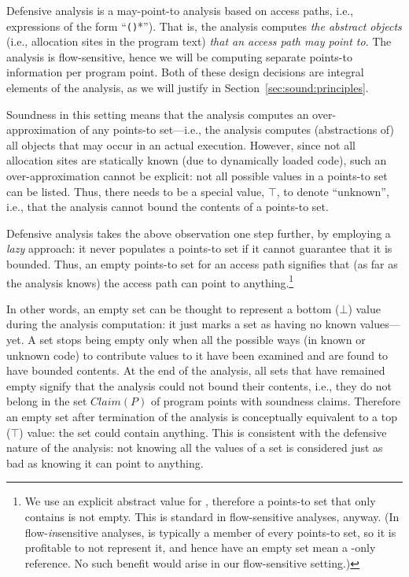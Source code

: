 Defensive analysis is a may-point-to analysis based on access paths, i.e., expressions of the form ``\texttt{()}*''). That is, the analysis computes \emph{the abstract objects} (i.e., allocation sites in the program text) \emph{that an access path may point to}. The analysis is flow-sensitive, hence we will be computing separate points-to information per program point. Both of these design decisions are integral elements of the analysis, as we will justify in Section~\ref{sec:sound:principles}.

Soundness in this setting means that the analysis computes an over-approximation of any points-to set---i.e., the analysis computes (abstractions of) all objects that may occur in an actual execution. However, since not all allocation sites are statically known (due to dynamically loaded code), such an over-approximation cannot be explicit: not all possible values in a points-to set can be listed. Thus, there needs to be a special value, $\top$, to denote ``unknown'', i.e., that the analysis cannot bound the contents of a points-to set.

Defensive analysis takes the above observation one step further, by employing a \emph{lazy} approach: it never populates a points-to set if it cannot guarantee that it is bounded. Thus, an empty points-to set for an access path signifies that (as far as the analysis knows) the access path can point to anything.\footnote{We use an explicit abstract value for , therefore a points-to set that only contains  is not empty. This is standard in flow-sensitive analyses, anyway. (In flow-\emph{in}sensitive analyses,  is typically a member of every points-to set, so it is profitable to not represent it, and hence have an empty set mean a -only reference. No such benefit would arise in our flow-sensitive setting.)}

In other words, an empty set can be thought to represent a bottom ($\bot$) value during the analysis computation: it just marks a set as having no known values---yet. A set stops being empty only when all the possible ways (in known or unknown code) to contribute values to it have been examined and are found to have bounded contents. At the end of the analysis, all sets that have remained empty signify that the analysis could not bound their contents, i.e., they do not belong in the set $Claim(P)$ of program points with soundness claims. Therefore an empty set after termination of the analysis is conceptually equivalent to a top ($\top$) value: the set could contain anything. This is consistent with the defensive nature of the analysis: not knowing all the values of a set is considered just as bad as knowing it can point to anything.

